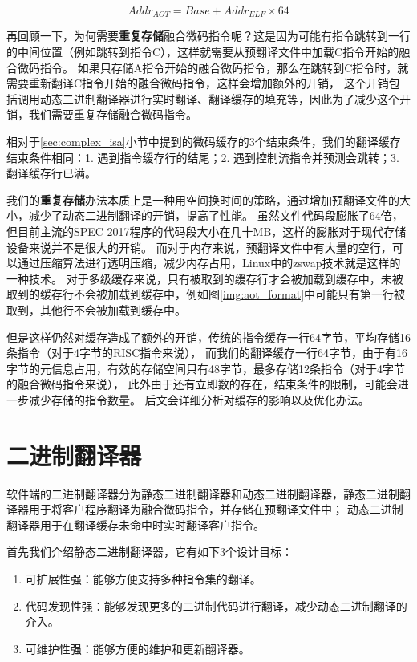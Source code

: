 \begin{equation}
Addr_{AOT} = Base +  Addr_{ELF} \times 64 
\end{equation}

再回顾一下，为何需要\textbf{重复存储}融合微码指令呢？这是因为可能有指令跳转到一行的中间位置（例如跳转到指令C），这样就需要从预翻译文件中加载C指令开始的融合微码指令。
如果只存储A指令开始的融合微码指令，那么在跳转到C指令时，就需要重新翻译C指令开始的融合微码指令，这样会增加额外的开销，
这个开销包括调用动态二进制翻译器进行实时翻译、翻译缓存的填充等，因此为了减少这个开销，我们需要重复存储融合微码指令。

相对于\ref{sec:complex_isa}小节中提到的微码缓存的3个结束条件，我们的翻译缓存结束条件相同：1. 遇到指令缓存行的结尾；2. 遇到控制流指令并预测会跳转；3. 翻译缓存行已满。

我们的\textbf{重复存储}办法本质上是一种用空间换时间的策略，通过增加预翻译文件的大小，减少了动态二进制翻译的开销，提高了性能。
虽然文件代码段膨胀了64倍，但目前主流的SPEC 2017程序的代码段大小在几十MB，这样的膨胀对于现代存储设备来说并不是很大的开销。
而对于内存来说，预翻译文件中有大量的空行，可以通过压缩算法进行透明压缩，减少内存占用，Linux中的zswap技术就是这样的一种技术。
对于多级缓存来说，只有被取到的缓存行才会被加载到缓存中，未被取到的缓存行不会被加载到缓存中，例如图\ref{img:aot_format}中可能只有第一行被取到，其他行不会被加载到缓存中。

但是这样仍然对缓存造成了额外的开销，传统的指令缓存一行64字节，平均存储16条指令（对于4字节的RISC指令来说），
而我们的翻译缓存一行64字节，由于有16字节的元信息占用，有效的存储空间只有48字节，最多存储12条指令（对于4字节的融合微码指令来说），
此外由于还有立即数的存在，结束条件的限制，可能会进一步减少存储的指令数量。
后文会详细分析对缓存的影响以及优化办法。

\section{二进制翻译器}

软件端的二进制翻译器分为静态二进制翻译器和动态二进制翻译器，静态二进制翻译器用于将客户程序翻译为融合微码指令，并存储在预翻译文件中；
动态二进制翻译器用于在翻译缓存未命中时实时翻译客户指令。

首先我们介绍静态二进制翻译器，它有如下3个设计目标：
\begin{enumerate}
  \item 可扩展性强：能够方便支持多种指令集的翻译。
  \item 代码发现性强：能够发现更多的二进制代码进行翻译，减少动态二进制翻译的介入。
  \item 可维护性强：能够方便的维护和更新翻译器。
\end{enumerate}

